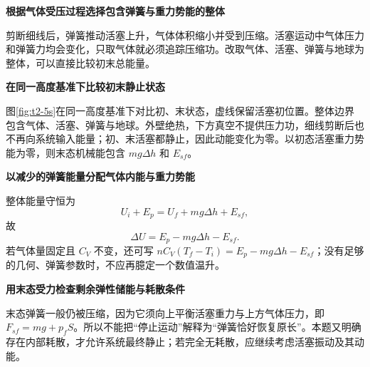 \begin{solution}\textbf{根据气体受压过程选择包含弹簧与重力势能的整体}\par\nobreak
剪断细线后，弹簧推动活塞上升，气体体积缩小并受到压缩。活塞运动中气体压力和弹簧力均会变化，只取气体就必须追踪压缩功。改取气体、活塞、弹簧与地球为整体，可以直接比较初末总能量。


\par\medskip{}\noindent\textbf{在同一高度基准下比较初末静止状态}\par\nobreak
图\ref{fig:t2-5s}在同一高度基准下对比初、末状态，虚线保留活塞初位置。整体边界包含气体、活塞、弹簧与地球。外壁绝热，下方真空不提供压力功，细线剪断后也不再向系统输入能量；初、末活塞都静止，因此动能变化为零。以初态活塞重力势能为零，则末态机械能包含 $mg\Delta h$ 和 $E_{sf}$。



\par\medskip{}\noindent\textbf{以减少的弹簧能量分配气体内能与重力势能}\par\nobreak
整体能量守恒为
\[U_i+E_p=U_f+mg\Delta h+E_{sf},\]
故
\[\boxed{\Delta U=E_p-mg\Delta h-E_{sf}}.\]
若气体量固定且 $C_V$ 不变，还可写 $nC_V(T_f-T_i)=E_p-mg\Delta h-E_{sf}$；没有足够的几何、弹簧参数时，不应再臆定一个数值温升。


\par\medskip{}\noindent\textbf{用末态受力检查剩余弹性储能与耗散条件}\par\nobreak
末态弹簧一般仍被压缩，因为它须向上平衡活塞重力与上方气体压力，即 $F_{sf}=mg+p_fS$。所以不能把“停止运动”解释为“弹簧恰好恢复原长”。本题又明确存在内部耗散，才允许系统最终静止；若完全无耗散，应继续考虑活塞振动及其动能。
\end{solution}
